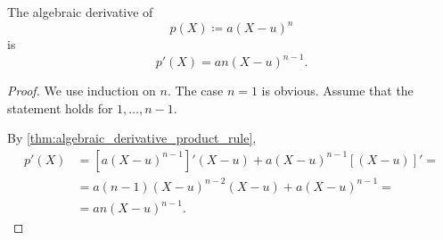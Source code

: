 \begin{proposition}\label{thm:algebraic_derivative_of_linear_polynomial_power}
  The algebraic derivative of
  \begin{equation*}
    p(X) \coloneqq a (X - u)^n
  \end{equation*}
  is
  \begin{equation*}
    p'(X) = an(X - u)^{n-1}.
  \end{equation*}
\end{proposition}
\begin{proof}
  We use induction on \( n \). The case \( n = 1 \) is obvious. Assume that the statement holds for \( 1, \ldots, n - 1 \).

  By \cref{thm:algebraic_derivative_product_rule},
  \begin{align*}
    p'(X)
    &=
    [a(X - u)^{n-1}]' (X - u) + a(X - u)^{n-1} [(X - u)]'
    = \\ &=
    a(n-1)(X - u)^{n-2} (X - u) + a(X - u)^{n-1}
    = \\ &=
    an(X - u)^{n-1}.
  \end{align*}
\end{proof}

